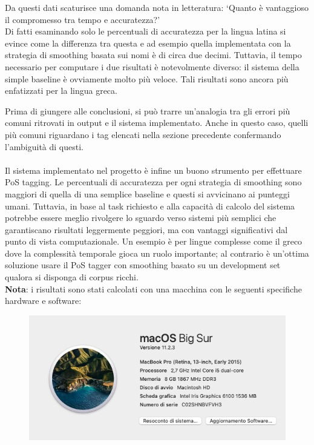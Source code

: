 \documentclass[12pt]{article}
\begin{document}
Da questi dati scaturisce una domanda nota in letteratura:  ‘Quanto è vantaggioso il compromesso tra tempo e accuratezza?’ 
\\Di fatti esaminando solo le percentuali di accuratezza  per la lingua latina si evince come la differenza tra questa e ad esempio quella implementata con la strategia di smoothing basata sui nomi è di circa due decimi. Tuttavia, il tempo necessario per computare i due risultati è notevolmente diverso: il sistema della simple baseline è ovviamente molto più veloce. Tali risultati sono ancora più enfatizzati per la lingua greca. 

Prima di giungere alle conclusioni, si può trarre un’analogia tra gli errori più comuni ritrovati in output e il sistema implementato. Anche in questo caso, quelli più comuni riguardano i tag elencati nella sezione precedente confermando l'ambiguità di questi.
\\
\\Il sistema implementato nel progetto è infine un buono strumento per effettuare PoS tagging. Le percentuali di accuratezza per ogni strategia di smoothing sono maggiori di quella di una semplice baseline e questi si avvicinano ai punteggi umani. Tuttavia, in base al task richiesto e alla capacità di calcolo del sistema potrebbe essere meglio rivolgere lo sguardo verso sistemi più semplici che garantiscano risultati leggermente peggiori, ma con vantaggi significativi dal punto di vista computazionale. Un esempio è per lingue complesse come il greco dove la complessità temporale gioca un ruolo importante; al contrario è un’ottima soluzione usare il PoS tagger con smoothing basato su un development set qualora si disponga di corpus ricchi.\\

\textbf{Nota}: i risultati sono stati calcolati con una macchina con le seguenti specifiche hardware e software:
\begin{figure}[H]
    \centering
    \includegraphics[scale=0.5]{fig/Sistema.png}
    \label{fig:sistema}
\end{figure}
\newpage
\end{document}
